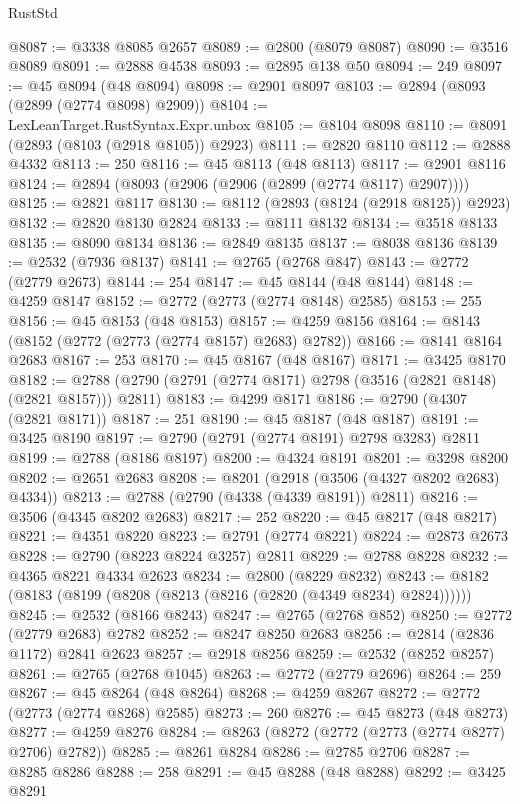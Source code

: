 \begin{lexlean}{RustStd}
\begin{coremodule}
@8087 := @3338 @8085 @2657
@8089 := @2800 (@8079 @8087)
@8090 := @3516 @8089
@8091 := @2888 @4538
@8093 := @2895 @138 @50
@8094 := 249
@8097 := @45 @8094 (@48 @8094)
@8098 := @2901 @8097
@8103 := @2894 (@8093 (@2899 (@2774 @8098) @2909))
@8104 := LexLeanTarget.RustSyntax.Expr.unbox
@8105 := @8104 @8098
@8110 := @8091 (@2893 (@8103 (@2918 @8105)) @2923)
@8111 := @2820 @8110
@8112 := @2888 @4332
@8113 := 250
@8116 := @45 @8113 (@48 @8113)
@8117 := @2901 @8116
@8124 := @2894 (@8093 (@2906 (@2906 (@2899 (@2774 @8117) @2907))))
@8125 := @2821 @8117
@8130 := @8112 (@2893 (@8124 (@2918 @8125)) @2923)
@8132 := @2820 @8130 @2824
@8133 := @8111 @8132
@8134 := @3518 @8133
@8135 := @8090 @8134
@8136 := @2849 @8135
@8137 := @8038 @8136
@8139 := @2532 (@7936 @8137)
@8141 := @2765 (@2768 @847)
@8143 := @2772 (@2779 @2673)
@8144 := 254
@8147 := @45 @8144 (@48 @8144)
@8148 := @4259 @8147
@8152 := @2772 (@2773 (@2774 @8148) @2585)
@8153 := 255
@8156 := @45 @8153 (@48 @8153)
@8157 := @4259 @8156
@8164 := @8143 (@8152 (@2772 (@2773 (@2774 @8157) @2683) @2782))
@8166 := @8141 @8164 @2683
@8167 := 253
@8170 := @45 @8167 (@48 @8167)
@8171 := @3425 @8170
@8182 := @2788 (@2790 (@2791 (@2774 @8171) @2798 (@3516 (@2821 @8148) (@2821 @8157))) @2811)
@8183 := @4299 @8171
@8186 := @2790 (@4307 (@2821 @8171))
@8187 := 251
@8190 := @45 @8187 (@48 @8187)
@8191 := @3425 @8190
@8197 := @2790 (@2791 (@2774 @8191) @2798 @3283) @2811
@8199 := @2788 (@8186 @8197)
@8200 := @4324 @8191
@8201 := @3298 @8200
@8202 := @2651 @2683
@8208 := @8201 (@2918 (@3506 (@4327 @8202 @2683) @4334))
@8213 := @2788 (@2790 (@4338 (@4339 @8191)) @2811)
@8216 := @3506 (@4345 @8202 @2683)
@8217 := 252
@8220 := @45 @8217 (@48 @8217)
@8221 := @4351 @8220
@8223 := @2791 (@2774 @8221)
@8224 := @2873 @2673
@8228 := @2790 (@8223 @8224 @3257) @2811
@8229 := @2788 @8228
@8232 := @4365 @8221 @4334 @2623
@8234 := @2800 (@8229 @8232)
@8243 := @8182 (@8183 (@8199 (@8208 (@8213 (@8216 (@2820 (@4349 @8234) @2824))))))
@8245 := @2532 (@8166 @8243)
@8247 := @2765 (@2768 @852)
@8250 := @2772 (@2779 @2683) @2782
@8252 := @8247 @8250 @2683
@8256 := @2814 (@2836 @1172) @2841 @2623
@8257 := @2918 @8256
@8259 := @2532 (@8252 @8257)
@8261 := @2765 (@2768 @1045)
@8263 := @2772 (@2779 @2696)
@8264 := 259
@8267 := @45 @8264 (@48 @8264)
@8268 := @4259 @8267
@8272 := @2772 (@2773 (@2774 @8268) @2585)
@8273 := 260
@8276 := @45 @8273 (@48 @8273)
@8277 := @4259 @8276
@8284 := @8263 (@8272 (@2772 (@2773 (@2774 @8277) @2706) @2782))
@8285 := @8261 @8284
@8286 := @2785 @2706
@8287 := @8285 @8286
@8288 := 258
@8291 := @45 @8288 (@48 @8288)
@8292 := @3425 @8291

\end{coremodule}
\end{lexlean}
